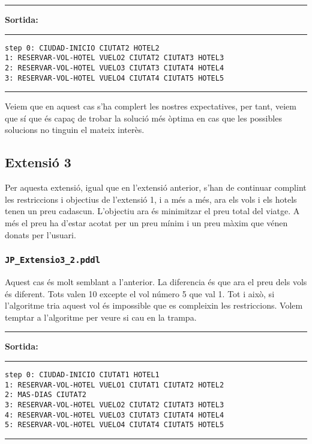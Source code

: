 \documentclass[11pt,a4paper]{article}
\begin{document}
\begin{samepage}
\medskip
\noindent
\rule{0.1\textwidth}{0.5mm}
\textbf{Sortida:}
\rule{0.76\textwidth}{0.5mm}
\begin{verbatim}
step 0: CIUDAD-INICIO CIUTAT2 HOTEL2
1: RESERVAR-VOL-HOTEL VUELO2 CIUTAT2 CIUTAT3 HOTEL3
2: RESERVAR-VOL-HOTEL VUELO3 CIUTAT3 CIUTAT4 HOTEL4
3: RESERVAR-VOL-HOTEL VUELO4 CIUTAT4 CIUTAT5 HOTEL5
\end{verbatim}
\rule{\textwidth}{0.5mm}
\medskip
\end{samepage}

Veiem que en aquest cas s'ha complert les nostres expectatives, per tant, veiem que sí que és capaç de trobar la solució més òptima en cas que les possibles solucions no tinguin el mateix interès.


\subsection{Extensió 3}

Per aquesta extensió, igual que en l'extensió anterior, s'han de continuar complint les restriccions i objectius de l'extensió 1, i a més a més, ara els vols i els hotels tenen un preu cadascun.
L'objectiu ara és minimitzar el preu total del viatge. A més el preu ha d'estar acotat per un preu mínim i un preu màxim que vénen donats per l'usuari.

\subsubsection*{\texttt{JP\_Extensio3\_2.pddl}}

Aquest cas és molt semblant a l'anterior. La diferencia és que ara el preu dels vols és diferent. Tots valen 10 excepte el vol número 5 que val 1. Tot i això, si l'algoritme tria aquest vol és impossible que es compleixin les restriccions. Volem temptar a l'algoritme per veure si cau en la trampa.

\begin{samepage}
\medskip
\noindent
\rule{0.1\textwidth}{0.5mm}
\textbf{Sortida:}
\rule{0.76\textwidth}{0.5mm}
\begin{verbatim}
step 0: CIUDAD-INICIO CIUTAT1 HOTEL1
1: RESERVAR-VOL-HOTEL VUELO1 CIUTAT1 CIUTAT2 HOTEL2
2: MAS-DIAS CIUTAT2
3: RESERVAR-VOL-HOTEL VUELO2 CIUTAT2 CIUTAT3 HOTEL3
4: RESERVAR-VOL-HOTEL VUELO3 CIUTAT3 CIUTAT4 HOTEL4
5: RESERVAR-VOL-HOTEL VUELO4 CIUTAT4 CIUTAT5 HOTEL5
\end{verbatim}
\rule{\textwidth}{0.5mm}
\medskip
\end{samepage}
\end{document}
